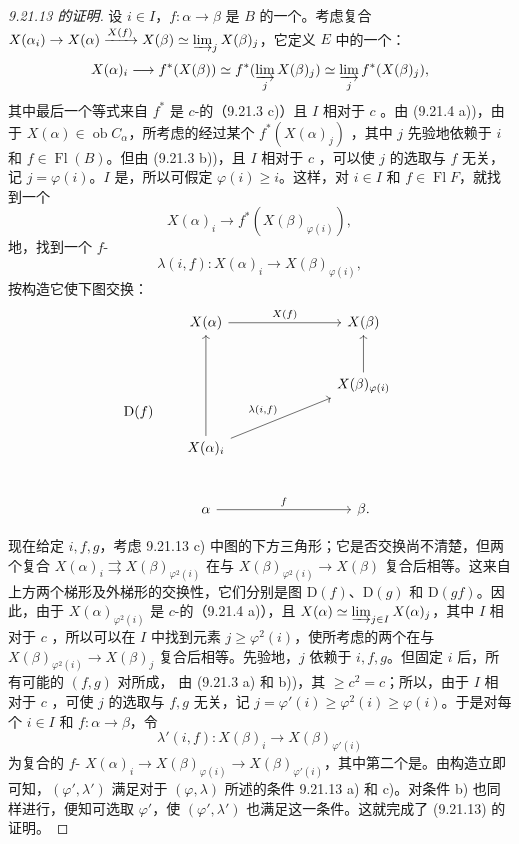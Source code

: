 \begin{proof}[9.21.13 的证明]
设 $i\in I$，$f:\alpha\to\beta$ 是 $B$ 的一个。考虑复合 $X(\alpha_i)\to X(\alpha)\xrightarrow{X(f)}X(\beta)\simeq\varinjlim_jX(\beta)_j$，它定义 $E$ 中的一个：
\[
X(\alpha)_i\longrightarrow f^*(X(\beta))
\simeq f^*(\varinjlim_jX(\beta)_j)
\simeq\varinjlim_jf^*(X(\beta)_j),
\]
其中最后一个等式来自 $f^*$ 是 $c$-的（9.21.3 c)）且 $I$ 相对于 $c$ 。由 (9.21.4 a))，由于 $X(\alpha)\in\operatorname{ob}C_\alpha$，所考虑的经过某个 $f^*(X(\alpha)_j)$ ，其中 $j$ 先验地依赖于 $i$ 和 $f\in\operatorname{Fl}(B)$。但由 (9.21.3 b))，且 $I$ 相对于 $c$ ，可以使 $j$ 的选取与 $f$ 无关，记 $j=\varphi(i)$。$I$ 是，所以可假定 $\varphi(i)\geq i$。这样，对 $i\in I$ 和 $f\in\operatorname{Fl}F$，就找到一个
\[
X(\alpha)_i\longrightarrow f^*(X(\beta)_{\varphi(i)}),
\]
地，找到一个 $f$-
\[
\lambda(i,f):X(\alpha)_i\longrightarrow X(\beta)_{\varphi(i)},
\]
按构造它使下图交换：
\[
\mathrm D(f)\qquad
\begin{tikzcd}[column sep=large,row sep=large]
X(\alpha)\arrow[rr,"X(f)"]&&X(\beta)\\
&&X(\beta)_{\varphi(i)}\arrow[u]\\
X(\alpha)_i\arrow[uu]\arrow[urr,"{\lambda(i,f)}"]&&\\
\alpha\arrow[rr,"f"]&&\beta .
\end{tikzcd}
\]

现在给定 $i,f,g$，考虑 9.21.13 c) 中图的下方三角形；它是否交换尚不清楚，但两个复合 $X(\alpha)_i\rightrightarrows X(\beta)_{\varphi^2(i)}$ 在与 $X(\beta)_{\varphi^2(i)}\to X(\beta)$ 复合后相等。这来自上方两个梯形及外梯形的交换性，它们分别是图 $\mathrm D(f)$、$\mathrm D(g)$ 和 $\mathrm D(gf)$。因此，由于 $X(\alpha)_{\varphi^2(i)}$ 是 $c$-的（9.21.4 a)），且 $X(\alpha)\simeq\varinjlim_{j\in I}X(\alpha)_j$，其中 $I$ 相对于 $c$ ，所以可以在 $I$ 中找到元素 $j\geq\varphi^2(i)$，使所考虑的两个在与 $X(\beta)_{\varphi^2(i)}\to X(\beta)_j$ 复合后相等。先验地，$j$ 依赖于 $i,f,g$。但固定 $i$ 后，所有可能的 $(f,g)$ 对所成，
由 (9.21.3 a) 和 b))，其 $\geq c^2=c$；所以，由于 $I$ 相对于 $c$ ，可使 $j$ 的选取与 $f,g$ 无关，记 $j=\varphi'(i)\geq\varphi^2(i)\geq\varphi(i)$。于是对每个 $i\in I$ 和 $f:\alpha\to\beta$，令
\[
\lambda'(i,f):X(\beta)_i\longrightarrow X(\beta)_{\varphi'(i)}
\]
为复合的 $f$- $X(\alpha)_i\to X(\beta)_{\varphi(i)}\to X(\beta)_{\varphi'(i)}$，其中第二个是。由构造立即可知，$(\varphi',\lambda')$ 满足对于 $(\varphi,\lambda)$ 所述的条件 9.21.13 a) 和 c)。对条件 b) 也同样进行，便知可选取 $\varphi'$，使 $(\varphi',\lambda')$ 也满足这一条件。这就完成了 (9.21.13) 的证明。
\end{proof}

